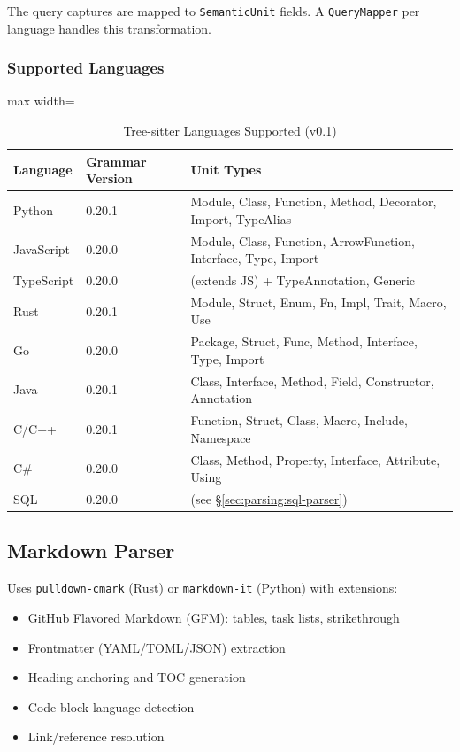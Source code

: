 The query captures are mapped to \texttt{SemanticUnit} fields. A \texttt{QueryMapper} per language handles this transformation.

\subsubsection{Supported Languages}
\label{sec:parsing:ts-languages}

\begin{table}[htbp]
\centering
\caption{Tree-sitter Languages Supported (v0.1)}
\label{tab:parsing:ts-languages}
\begin{adjustbox}{max width=\textwidth}
\begin{tabular}{lll}
\toprule
\textbf{Language} & \textbf{Grammar Version} & \textbf{Unit Types} \\
\midrule
Python & 0.20.1 & Module, Class, Function, Method, Decorator, Import, TypeAlias \\
JavaScript & 0.20.0 & Module, Class, Function, ArrowFunction, Interface, Type, Import \\
TypeScript & 0.20.0 & (extends JS) + TypeAnnotation, Generic \\
Rust & 0.20.1 & Module, Struct, Enum, Fn, Impl, Trait, Macro, Use \\
Go & 0.20.0 & Package, Struct, Func, Method, Interface, Type, Import \\
Java & 0.20.1 & Class, Interface, Method, Field, Constructor, Annotation \\
C/C++ & 0.20.1 & Function, Struct, Class, Macro, Include, Namespace \\
C\# & 0.20.0 & Class, Method, Property, Interface, Attribute, Using \\
SQL & 0.20.0 & (see \S\ref{sec:parsing:sql-parser}) \\
\bottomrule
\end{tabular}
\end{adjustbox}
\end{table}

\subsection{Markdown Parser}
\label{sec:parsing:markdown}

Uses \texttt{pulldown-cmark} (Rust) or \texttt{markdown-it} (Python) with extensions:
\begin{itemize}
  \item GitHub Flavored Markdown (GFM): tables, task lists, strikethrough
  \item Frontmatter (YAML/TOML/JSON) extraction
  \item Heading anchoring and TOC generation
  \item Code block language detection
  \item Link/reference resolution
\end{itemize}

